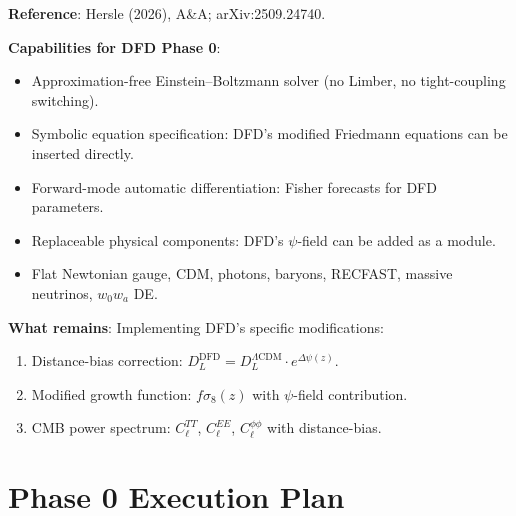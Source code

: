 \documentclass[11pt,a4paper]{article}
\begin{document}
\begin{tcolorbox}[colback=green!5!white, colframe=green!60!black,
  title={SymBoltz.jl Published in A\&A (March 2026)}]

\textbf{Reference}: Hersle (2026), A\&A; arXiv:2509.24740.

\textbf{Capabilities for DFD Phase 0}:
\begin{itemize}
\item Approximation-free Einstein--Boltzmann solver (no Limber, no tight-coupling switching).
\item Symbolic equation specification: DFD's modified Friedmann equations can be inserted directly.
\item Forward-mode automatic differentiation: Fisher forecasts for DFD parameters.
\item Replaceable physical components: DFD's $\psi$-field can be added as a module.
\item Flat Newtonian gauge, CDM, photons, baryons, RECFAST, massive neutrinos, $w_0 w_a$ DE.
\end{itemize}

\textbf{What remains}: Implementing DFD's specific modifications:
\begin{enumerate}
\item Distance-bias correction: $D_L^{\text{DFD}} = D_L^{\Lambda\text{CDM}} \cdot e^{\Delta\psi(z)}$.
\item Modified growth function: $f\sigma_8(z)$ with $\psi$-field contribution.
\item CMB power spectrum: $C_\ell^{TT}$, $C_\ell^{EE}$, $C_\ell^{\phi\phi}$ with distance-bias.
\end{enumerate}
\end{tcolorbox}

\section{Phase 0 Execution Plan}
\end{document}
